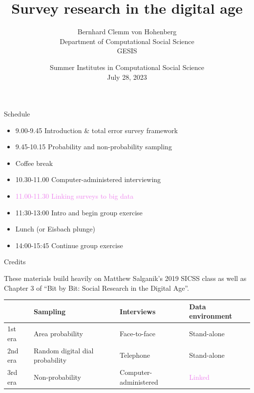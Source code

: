 \documentclass[aspectratio=169]{beamer}
\title[]{Survey research in the digital age}
\author[]{Bernhard Clemm von Hohenberg\\Department of Computational Social Science\\GESIS}
\date[]{Summer Institutes in Computational Social Science\\July 28, 2023}
\begin{document}
\frame{\titlepage}
\begin{frame}{Schedule}

\vspace{0.5em}
\begin{itemize}
\item 9.00-9.45 Introduction \& total error survey framework
\item 9.45-10.15 Probability and non-probability sampling
\vspace{0.5em}
\item Coffee break
\vspace{0.5em}
\item 10.30-11.00 Computer-administered interviewing
\item \textcolor{violet}{11.00-11.30 Linking surveys to big data}
\item 11:30-13:00 Intro and begin group exercise
\vspace{0.5em}
\item Lunch (or Eisbach plunge)
\vspace{0.5em}
\item 14:00-15:45 Continue group exercise
\end{itemize}

\end{frame}
\begin{frame}{Credits}

These materials build heavily on Matthew Salganik's 2019 SICSS class as well as Chapter 3 of ``Bit by Bit: Social Research in the Digital Age''.

\end{frame}
\begin{frame}
\begin{center}
\renewcommand{\arraystretch}{1.5}
\begin{tabular}{p{}p{}p{}p{}}
& \textbf{Sampling} & \textbf{Interviews} & \textbf{Data environment}\\
\hline \hline
1st era & Area probability & Face-to-face & Stand-alone \\
\hline
2nd era & Random digital dial probability & Telephone & Stand-alone \\
\hline
3rd era & Non-probability & Computer-administered  & \textcolor{violet}{Linked} \\
\end{tabular}
\end{center}

\end{frame}
\end{document}
